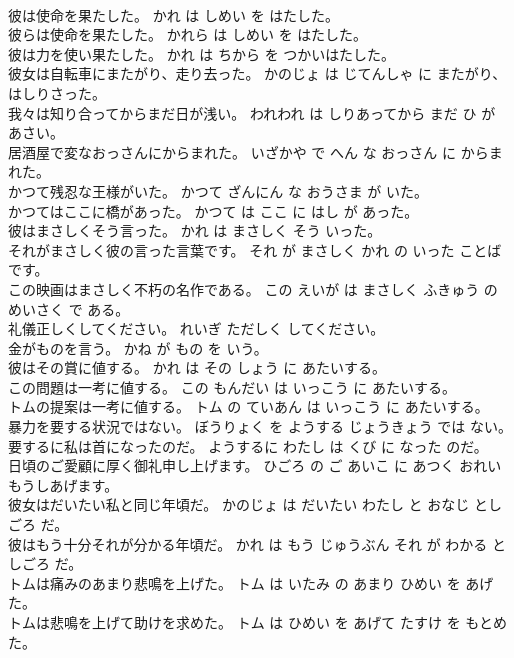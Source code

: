 \documentclass[8pt]{extreport}
\begin{document}
\begin{CJK}{UTF8}{min}
\\	彼は使命を果たした。	かれ は しめい を はたした。	
\\	彼らは使命を果たした。	かれら は しめい を はたした。	
\\	彼は力を使い果たした。	かれ は ちから を つかいはたした。	
\\	彼女は自転車にまたがり、走り去った。	かのじょ は じてんしゃ に またがり、はしりさった。	
\\	我々は知り合ってからまだ日が浅い。	われわれ は しりあってから まだ ひ が あさい。	
\\	居酒屋で変なおっさんにからまれた。	いざかや で へん な おっさん に からまれた。	
\\	かつて残忍な王様がいた。	かつて ざんにん な おうさま が いた。	
\\	かつてはここに橋があった。	かつて は ここ に はし が あった。	
\\	彼はまさしくそう言った。	かれ は まさしく そう いった。	
\\	それがまさしく彼の言った言葉です。	それ が まさしく かれ の いった ことば です。	
\\	この映画はまさしく不朽の名作である。	この えいが は まさしく ふきゅう の めいさく で ある。	
\\	礼儀正しくしてください。	れいぎ ただしく してください。	
\\	金がものを言う。	かね が もの を いう。	
\\	彼はその賞に値する。	かれ は その しょう に あたいする。	
\\	この問題は一考に値する。	この もんだい は いっこう に あたいする。	
\\	トムの提案は一考に値する。	トム の ていあん は いっこう に あたいする。	
\\	暴力を要する状況ではない。	ぼうりょく を ようする じょうきょう では ない。	
\\	要するに私は首になったのだ。	ようするに わたし は くび に なった のだ。	
\\	日頃のご愛顧に厚く御礼申し上げます。	ひごろ の ご あいこ に あつく おれい もうしあげます。	
\\	彼女はだいたい私と同じ年頃だ。	かのじょ は だいたい わたし と おなじ としごろ だ。	
\\	彼はもう十分それが分かる年頃だ。	かれ は もう じゅうぶん それ が わかる としごろ だ。	
\\	トムは痛みのあまり悲鳴を上げた。	トム は いたみ の あまり ひめい を あげた。	
\\	トムは悲鳴を上げて助けを求めた。	トム は ひめい を あげて たすけ を もとめた。	

\end{CJK}
\end{document}
